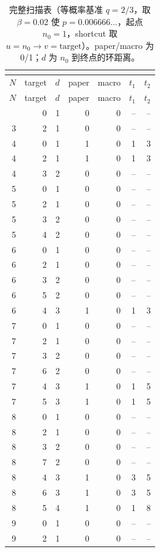 \begin{longtable}{rrrrrrr}
\caption{完整扫描表（等概率基准 $q=2/3$，取 $\beta=0.02$ 使 $p=0.006666\ldots$，起点 $n_0=1$，shortcut 取 $u=n_0\to v=\mathrm{target}$）。paper/macro 为 0/1；$d$ 为 $n_0$ 到终点的环距离。}\\
\label{tab:fullscan-cn}\\
\toprule
$N$ & target & $d$ & paper & macro & $t_1$ & $t_2$\\
\midrule
\endfirsthead
\toprule
$N$ & target & $d$ & paper & macro & $t_1$ & $t_2$\\
\midrule
\endhead
\bottomrule
\endfoot
3 & 0 & 1 & 0 & 0 & -- & --\\
3 & 2 & 1 & 0 & 0 & -- & --\\
4 & 0 & 1 & 1 & 0 & 1 & 3\\
4 & 2 & 1 & 1 & 0 & 1 & 3\\
4 & 3 & 2 & 0 & 0 & -- & --\\
5 & 0 & 1 & 0 & 0 & -- & --\\
5 & 2 & 1 & 0 & 0 & -- & --\\
5 & 3 & 2 & 0 & 0 & -- & --\\
5 & 4 & 2 & 0 & 0 & -- & --\\
6 & 0 & 1 & 0 & 0 & -- & --\\
6 & 2 & 1 & 0 & 0 & -- & --\\
6 & 3 & 2 & 0 & 0 & -- & --\\
6 & 5 & 2 & 0 & 0 & -- & --\\
6 & 4 & 3 & 1 & 0 & 1 & 3\\
7 & 0 & 1 & 0 & 0 & -- & --\\
7 & 2 & 1 & 0 & 0 & -- & --\\
7 & 3 & 2 & 0 & 0 & -- & --\\
7 & 6 & 2 & 0 & 0 & -- & --\\
7 & 4 & 3 & 1 & 0 & 1 & 5\\
7 & 5 & 3 & 1 & 0 & 1 & 5\\
8 & 0 & 1 & 0 & 0 & -- & --\\
8 & 2 & 1 & 0 & 0 & -- & --\\
8 & 3 & 2 & 0 & 0 & -- & --\\
8 & 7 & 2 & 0 & 0 & -- & --\\
8 & 4 & 3 & 1 & 0 & 3 & 5\\
8 & 6 & 3 & 1 & 0 & 3 & 5\\
8 & 5 & 4 & 1 & 0 & 1 & 8\\
9 & 0 & 1 & 0 & 0 & -- & --\\
9 & 2 & 1 & 0 & 0 & -- & --\\

\end{longtable}
